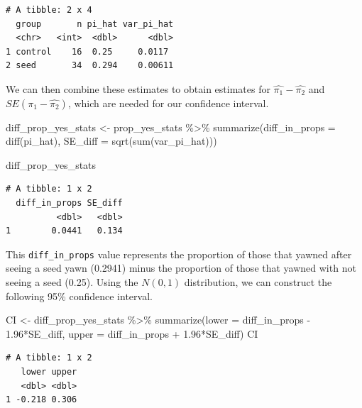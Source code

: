 \documentclass[
  letterpaper,
  DIV=11,
  numbers=noendperiod]{scrreprt}
\newenvironment{Shaded}{\begin{snugshade}}{\end{snugshade}}
\newcommand{\AttributeTok}[1]{\textcolor[rgb]{0.40,0.45,0.13}{#1}}
\newcommand{\FloatTok}[1]{\textcolor[rgb]{0.68,0.00,0.00}{#1}}
\newcommand{\FunctionTok}[1]{\textcolor[rgb]{0.28,0.35,0.67}{#1}}
\newcommand{\NormalTok}[1]{\textcolor[rgb]{0.00,0.23,0.31}{#1}}
\newcommand{\OtherTok}[1]{\textcolor[rgb]{0.00,0.23,0.31}{#1}}
\newcommand{\SpecialCharTok}[1]{\textcolor[rgb]{0.37,0.37,0.37}{#1}}
\theoremstyle{definition}
\theoremstyle{remark}
\begin{document}
\begin{verbatim}
# A tibble: 2 x 4
  group       n pi_hat var_pi_hat
  <chr>   <int>  <dbl>      <dbl>
1 control    16  0.25     0.0117 
2 seed       34  0.294    0.00611
\end{verbatim}

We can then combine these estimates to obtain estimates for
\(\hat{\pi_1} - \hat{\pi_2}\) and \(SE(\hat{\pi_1} - \hat{\pi_2})\),
which are needed for our confidence interval.

\begin{Shaded}
\begin{Highlighting}[]
\NormalTok{diff\_prop\_yes\_stats }\OtherTok{\textless{}{-}}\NormalTok{ prop\_yes\_stats }\SpecialCharTok{\%\textgreater{}\%} 
  \FunctionTok{summarize}\NormalTok{(}\AttributeTok{diff\_in\_props =} \FunctionTok{diff}\NormalTok{(pi\_hat),}
            \AttributeTok{SE\_diff =} \FunctionTok{sqrt}\NormalTok{(}\FunctionTok{sum}\NormalTok{(var\_pi\_hat))) }

\NormalTok{diff\_prop\_yes\_stats}
\end{Highlighting}
\end{Shaded}

\begin{verbatim}
# A tibble: 1 x 2
  diff_in_props SE_diff
          <dbl>   <dbl>
1        0.0441   0.134
\end{verbatim}

This \texttt{diff\_in\_props} value represents the proportion of those
that yawned after seeing a seed yawn (0.2941) minus the proportion of
those that yawned with not seeing a seed (0.25). Using the \(N(0,1)\)
distribution, we can construct the following 95\% confidence interval.

\begin{Shaded}
\begin{Highlighting}[]
\NormalTok{CI }\OtherTok{\textless{}{-}}\NormalTok{ diff\_prop\_yes\_stats }\SpecialCharTok{\%\textgreater{}\%} 
  \FunctionTok{summarize}\NormalTok{(}\AttributeTok{lower =}\NormalTok{ diff\_in\_props }\SpecialCharTok{{-}} \FloatTok{1.96}\SpecialCharTok{*}\NormalTok{SE\_diff,}
            \AttributeTok{upper =}\NormalTok{ diff\_in\_props }\SpecialCharTok{+} \FloatTok{1.96}\SpecialCharTok{*}\NormalTok{SE\_diff)}
\NormalTok{CI}
\end{Highlighting}
\end{Shaded}

\begin{verbatim}
# A tibble: 1 x 2
   lower upper
   <dbl> <dbl>
1 -0.218 0.306
\end{verbatim}
\end{document}

